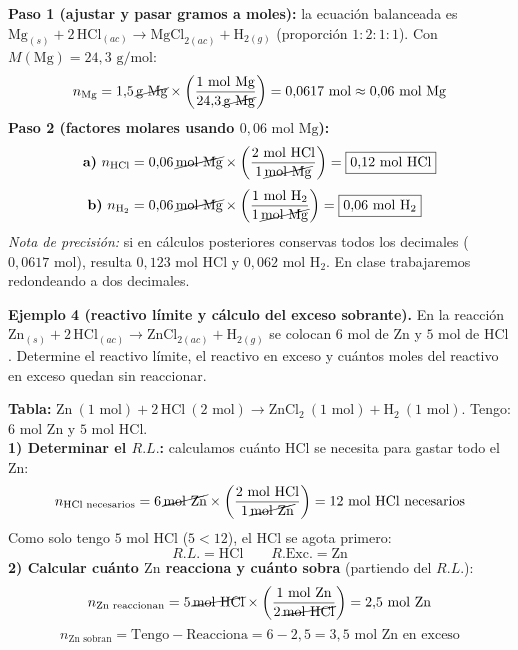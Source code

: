 \documentclass[12pt, letterpaper]{article}
\begin{document}
\begin{cuadrosolucion}[nobreak=true]
  \small
  \textbf{Paso 1 (ajustar y pasar gramos a moles):} la ecuación balanceada es $\text{Mg}_{(s)} + 2\,\text{HCl}_{(ac)} \longrightarrow \text{MgCl}_{2(ac)} + \text{H}_{2(g)}$ (proporción $1:2:1:1$). Con $M(\text{Mg}) = 24{,}3\text{ g/mol}$:
  \[
    n_{\text{Mg}} = 1{,}5\,\cancel{\text{g Mg}} \times \left(\frac{1\text{ mol Mg}}{24{,}3\,\cancel{\text{g Mg}}}\right) = 0{,}0617\text{ mol} \approx 0{,}06\text{ mol Mg}
  \]
  \textbf{Paso 2 (factores molares usando $0{,}06\text{ mol Mg}$):}
  \begin{align*}
    \textbf{a)}\ n_{\text{HCl}} &= 0{,}06\,\cancel{\text{mol Mg}} \times \left(\frac{2\text{ mol HCl}}{1\,\cancel{\text{mol Mg}}}\right) = \boxed{0{,}12\text{ mol HCl}} \\[3pt]
    \textbf{b)}\ n_{\text{H}_2} &= 0{,}06\,\cancel{\text{mol Mg}} \times \left(\frac{1\text{ mol H}_2}{1\,\cancel{\text{mol Mg}}}\right) = \boxed{0{,}06\text{ mol H}_2}
  \end{align*}
  \emph{Nota de precisión:} si en cálculos posteriores conservas todos los decimales ($0{,}0617\text{ mol}$), resulta $0{,}123\text{ mol HCl}$ y $0{,}062\text{ mol H}_2$. En clase trabajaremos redondeando a dos decimales.
\end{cuadrosolucion}

\medskip
\noindent\textbf{Ejemplo 4 (reactivo límite y cálculo del exceso sobrante).} En la reacción $\text{Zn}_{(s)} + 2\,\text{HCl}_{(ac)} \longrightarrow \text{ZnCl}_{2(ac)} + \text{H}_{2(g)}$ se colocan $6\text{ mol}$ de $\text{Zn}$ y $5\text{ mol}$ de $\text{HCl}$. Determine el reactivo límite, el reactivo en exceso y cuántos moles del reactivo en exceso quedan sin reaccionar.

\begin{cuadrosolucion}[nobreak=true]
  \small
  \textbf{Tabla:} $\text{Zn}\ (1\text{ mol}) + 2\,\text{HCl}\ (2\text{ mol}) \longrightarrow \text{ZnCl}_2\ (1\text{ mol}) + \text{H}_2\ (1\text{ mol})$. Tengo: $6\text{ mol Zn}$ y $5\text{ mol HCl}$.\\[3pt]
  \textbf{1) Determinar el $R.L.$:} calculamos cuánto $\text{HCl}$ se necesita para gastar todo el $\text{Zn}$:
  \[
    n_{\text{HCl necesarios}} = 6\,\cancel{\text{mol Zn}} \times \left(\frac{2\text{ mol HCl}}{1\,\cancel{\text{mol Zn}}}\right) = 12\text{ mol HCl necesarios}
  \]
  Como solo tengo $5\text{ mol HCl}$ ($5 < 12$), el $\text{HCl}$ se agota primero:
  \[
    \boxed{R.L. = \text{HCl}} \qquad \boxed{R.\text{Exc.} = \text{Zn}}
  \]
  \textbf{2) Calcular cuánto $\text{Zn}$ reacciona y cuánto sobra} (partiendo del $R.L.$):
  \[
    n_{\text{Zn reaccionan}} = 5\,\cancel{\text{mol HCl}} \times \left(\frac{1\text{ mol Zn}}{2\,\cancel{\text{mol HCl}}}\right) = 2{,}5\text{ mol Zn}
  \]
  \[
    n_{\text{Zn sobran}} = \text{Tengo} - \text{Reacciona} = 6 - 2{,}5 = \boxed{3{,}5\text{ mol Zn en exceso}}
  \]
\end{cuadrosolucion}
\end{document}
